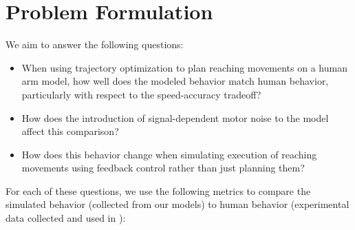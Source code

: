 \documentclass[letterpaper, 10pt, conference]{ieeeconf}
\begin{document}
\section{Problem Formulation}

We aim to answer the following questions: 
\begin{itemize}
    \item When using trajectory optimization to plan reaching movements on a human arm model, how well does the modeled behavior match human behavior, particularly with respect to the speed-accuracy tradeoff?

    \item How does the introduction of signal-dependent motor noise to the model affect this comparison?

    \item How does this behavior change when simulating execution of reaching movements using feedback control rather than just planning them?
\end{itemize}
For each of these questions, we use the following metrics to compare the simulated behavior (collected from our models) to human behavior (experimental data collected and used in \cite{original_paper_high_fidelity}):
\end{document}
